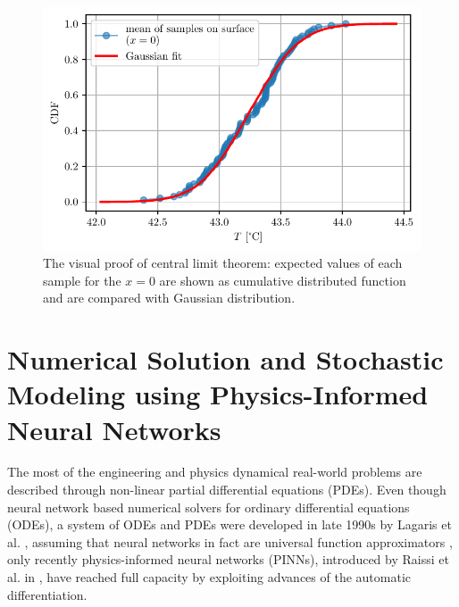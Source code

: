 \documentclass[conference]{IEEEtran}
\begin{document}
\begin{figure}[]
\centering
 \includegraphics[width=\linewidth]{figs/mc-distribution.pdf}
\caption{The visual proof of central limit theorem: expected values of each sample for the $x=0$ are shown as cumulative distributed function and are compared with Gaussian distribution.}
\label{fig.mc-distribution}
\end{figure}

\section{Numerical Solution and Stochastic Modeling using Physics-Informed Neural Networks}
\label{sec.pinn}
The most of the engineering and physics dynamical real-world problems are described through non-linear partial differential equations (PDEs). Even though neural network based numerical solvers for ordinary differential equations (ODEs), a system of ODEs and PDEs were developed in late 1990s by Lagaris et al. \cite{lagaris_ann_1998}, assuming that neural networks in fact are universal function approximators \cite{hornik_ufa_1989}, only recently physics-informed neural networks (PINNs), introduced by Raissi et al. in \cite{raissi_pinn_2018}, have reached full capacity by exploiting advances of the automatic differentiation. %
\end{document}

